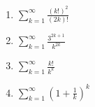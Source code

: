 \documentclass[week=6]{homework}
\begin{document}
\begin{questions}
\begin{enumerate}[label=(\alph*)]
	    	
	    	\item $\displaystyle \sum_{k=1}^{\infty} \frac{(k!)^2}{(2k)!}$
	    	
	    	
	    	\addtocounter{enumi}{2}
	    	\item $\displaystyle \sum_{k=1}^{\infty} \frac{3^{2k+1}}{k^{2k}}$
	    	
	    	
	    	\addtocounter{enumi}{1}
	    	\item $\displaystyle \sum_{k=1}^{\infty} \frac{k!}{k^k}$
	    	
	    	
	    	\addtocounter{enumi}{1}
	    	\item $\displaystyle \sum_{k=1}^{\infty} \left(1 + \frac{1}{k}\right)^k$
	    	
	    \end{enumerate}
     \end{questions}
\end{document}
